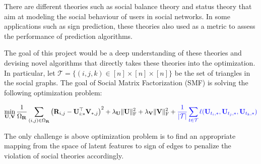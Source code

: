 \documentclass[11pt]{article}
\newcommand{\cT}{\mathcal{T}}
\newcommand{\bR}{\mathbf{R}}
\newcommand{\bU}{\mathbf{U}}
\newcommand{\bV}{\mathbf{V}}
\theoremstyle{definition}
\begin{document}
There are different theories such as social balance theory and status theory  that aim at modeling the social behaviour of users in social networks. In some applications such as sign prediction, these theories also used as a metric to assess the performance of prediction algorithms. 


The goal of this project would be a deep understanding of these theories and devising novel algorithms that directly takes these theories into the optimization. In particular, let $\cT = \{(i, j, k) \in [n]\times[n]\times[n]\} $
 be the set of triangles in the social graphs.  The goal of Social Matrix Factorization (SMF) is solving the following optimization problem:
 
 \[ \min_{\bU, \bV} \frac{1}{\Omega_{\bR}} \sum_{(i, j) \in \Omega_{\bR}}^{}{\left(\bR_{i,j}-\bU_{i:*}^{\top}\bV_{*,j}\right)^2} + \lambda_{\bU} \|\bU\|_{\text{F}}^2+ \lambda_{\bV} \|\bV\|_{\text{F}}^2 + \textcolor{blue}{\frac{1}{|\cT|}\sum_{t \in \cT}^{}{\ell(\bU_{t_i,*}, \bU_{t_j,*},\bU_{t_k,*} })}\]
 
The only challenge is above optimization problem is to find an appropriate mapping from the space of latent features to sign of edges to penalize the violation of social theories accordingly.  

\newpage


\end{document}
